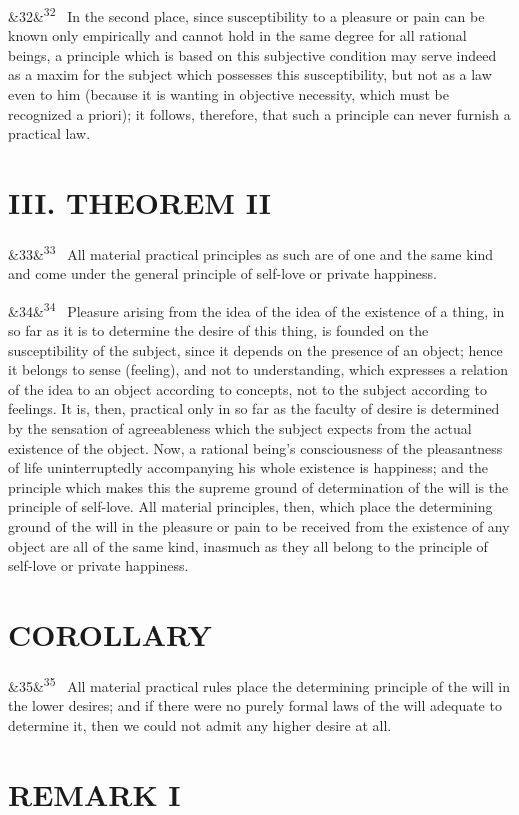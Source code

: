 \documentclass[12pt]{article}
\newcommand{\para}[1][]{\par\noindent\ifx&#1&\else\textsuperscript{\footnotesize #1}~\fi}
\begin{document}
\para[32] In the second place, since susceptibility to a pleasure or pain can be known only empirically and cannot hold in the same degree for all rational beings, a principle which is based on this subjective condition may serve indeed as a maxim for the subject which possesses this susceptibility, but not as a law even to him (because it is wanting in objective necessity, which must be recognized a priori); it follows, therefore, that such a principle can never furnish a practical law.

\section*{III. THEOREM II}

\para[33] All material practical principles as such are of one and the same kind and come under the general principle of self-love or private happiness.

\para[34] Pleasure arising from the idea of the idea of the existence of a thing, in so far as it is to determine the desire of this thing, is founded on the susceptibility of the subject, since it depends on the presence of an object; hence it belongs to sense (feeling), and not to understanding, which expresses a relation of the idea to an object according to concepts, not to the subject according to feelings. It is, then, practical only in so far as the faculty of desire is determined by the sensation of agreeableness which the subject expects from the actual existence of the object. Now, a rational being's consciousness of the pleasantness of life uninterruptedly accompanying his whole existence is happiness; and the principle which makes this the supreme ground of determination of the will is the principle of self-love. All material principles, then, which place the determining ground of the will in the pleasure or pain to be received from the existence of any object are all of the same kind, inasmuch as they all belong to the principle of self-love or private happiness.

\section*{COROLLARY}

\para[35] All material practical rules place the determining principle of the will in the lower desires; and if there were no purely formal laws of the will adequate to determine it, then we could not admit any higher desire at all.

\section*{REMARK I}
\end{document}
